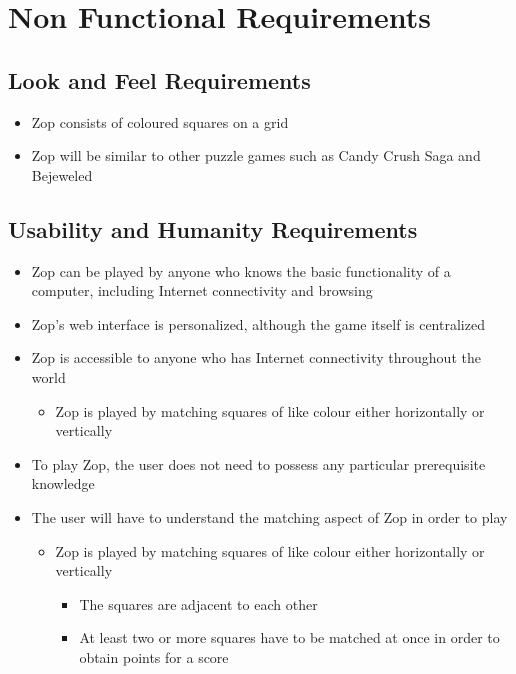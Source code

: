 \documentclass[12pt]{article}
\begin{document}
\section{Non Functional Requirements}
\subsection{Look and Feel Requirements}
\begin{itemize}
 \item Zop consists of coloured squares on a grid
 \item Zop will be similar to other puzzle games such as Candy Crush Saga and Bejeweled
\end{itemize}
\subsection{Usability and Humanity Requirements}
\begin{itemize}
 \item Zop can be played by anyone who knows the basic functionality of a computer, including Internet connectivity and browsing
 \item Zop's web interface is personalized, although the game itself is centralized
 \item Zop is accessible to anyone who has Internet connectivity throughout the world

 \begin{itemize}
  \item Zop is played by matching squares of like colour either horizontally or vertically
 \end{itemize}
 \item To play Zop, the user does not need to possess any particular prerequisite knowledge
 \item The user will have to understand the matching aspect of Zop in order to play
 \begin{itemize}
  \item Zop is played by matching squares of like colour either horizontally or vertically
  \begin{itemize}
   \item The squares are adjacent to each other
   \item At least two or more squares have to be matched at once in order to obtain points for a score
  \end{itemize}
 \end{itemize}
\end{itemize}
\end{document}

